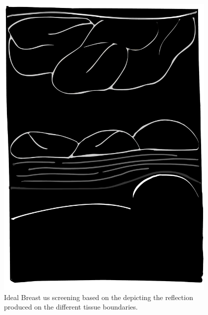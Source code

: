 \begin{frame}
\begin{columns}
\begin{column}{.48\textwidth}
\end{column}

\begin{column}{.48\textwidth}
		\begin{figure}
\includegraphics[width=.7\textwidth]{slice/US.pdf}
	\caption{Ideal Breast \ac{us} screening based on the depicting the reflection produced on the different tissue boundaries.}
		\end{figure}
\end{column}
\end{columns}
\end{frame}

